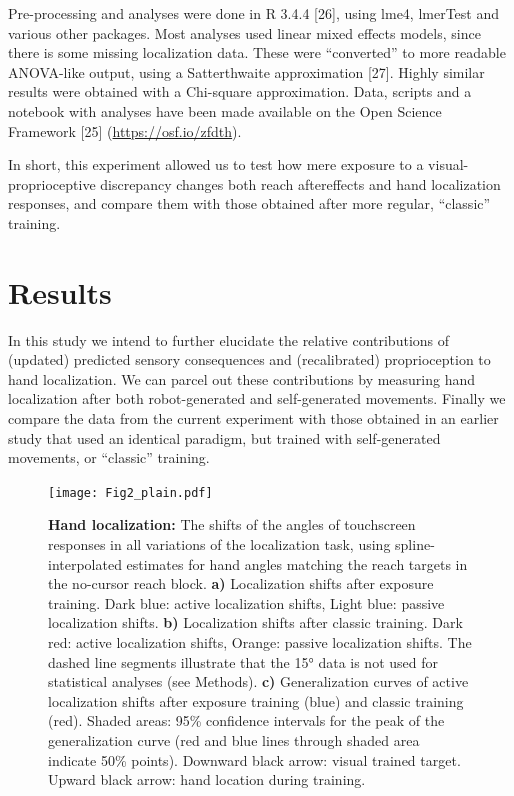 \documentclass[10pt,letterpaper]{article}
\begin{document}
Pre-processing and analyses were done in R 3.4.4 {[}26{]}, using lme4,
lmerTest and various other packages. Most analyses used linear mixed
effects models, since there is some missing localization data. These
were ``converted'' to more readable ANOVA-like output, using a
Satterthwaite approximation {[}27{]}. Highly similar results were
obtained with a Chi-square approximation. Data, scripts and a notebook
with analyses have been made available on the Open Science Framework
{[}25{]} (\href{https://osf.io/zfdth/}{https://osf.io/zfdth}).

In short, this experiment allowed us to test how mere exposure to a
visual-proprioceptive discrepancy changes both reach aftereffects and
hand localization responses, and compare them with those obtained after
more regular, ``classic'' training.

\section{Results}\label{results}

In this study we intend to further elucidate the relative contributions
of (updated) predicted sensory consequences and (recalibrated)
proprioception to hand localization. We can parcel out these
contributions by measuring hand localization after both robot-generated
and self-generated movements. Finally we compare the data from the
current experiment with those obtained in an earlier study that used an
identical paradigm, but trained with self-generated movements, or
``classic'' training.

\begin{figure}
\centering
\texttt{[image: Fig2\_plain.pdf]}
\caption{\textbf{Hand localization:} The shifts of the angles of
touchscreen responses in all variations of the localization task, using
spline-interpolated estimates for hand angles matching the reach targets
in the no-cursor reach block. \textbf{a)} Localization shifts after
exposure training. Dark blue: active localization shifts, Light blue:
passive localization shifts. \textbf{b)} Localization shifts after
classic training. Dark red: active localization shifts, Orange: passive
localization shifts. The dashed line segments illustrate that the 15°
data is not used for statistical analyses (see Methods). \textbf{c)}
Generalization curves of active localization shifts after exposure
training (blue) and classic training (red). Shaded areas: 95\%
confidence intervals for the peak of the generalization curve (red and
blue lines through shaded area indicate 50\% points). Downward black
arrow: visual trained target. Upward black arrow: hand location during
training.}
\end{figure}
\end{document}
